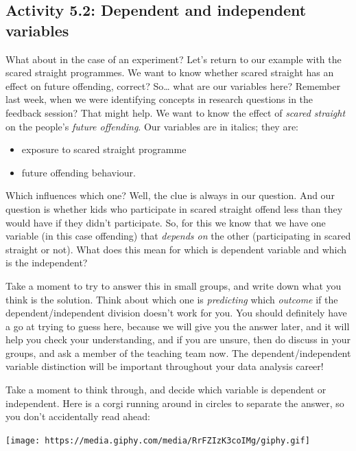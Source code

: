 \documentclass[
]{book}
\providecommand{\tightlist}{%
  \setlength{\itemsep}{0pt}\setlength{\parskip}{0pt}}
\begin{document}
\hypertarget{activity-5.2-dependent-and-independent-variables}{%
\subsection{Activity 5.2: Dependent and independent variables}\label{activity-5.2-dependent-and-independent-variables}}

What about in the case of an experiment? Let's return to our example with the scared straight programmes. We want to know whether scared straight has an effect on future offending, correct? So\ldots{} what are our variables here? Remember last week, when we were identifying concepts in research questions in the feedback session? That might help. We want to know the effect of \emph{scared straight} on the people's \emph{future offending}. Our variables are in italics; they are:

\begin{itemize}
\tightlist
\item
  exposure to scared straight programme
\item
  future offending behaviour.
\end{itemize}

Which influences which one? Well, the clue is always in our question. And our question is whether kids who participate in scared straight offend less than they would have if they didn't participate. So, for this we know that we have one variable (in this case offending) that \emph{depends on} the other (participating in scared straight or not). What does this mean for which is dependent variable and which is the independent?

Take a moment to try to answer this in small groups, and write down what you think is the solution. Think about which one is \emph{predicting} which \emph{outcome} if the dependent/independent division doesn't work for you. You should definitely have a go at trying to guess here, because we will give you the answer later, and it will help you check your understanding, and if you are unsure, then do discuss in your groups, and ask a member of the teaching team now. The dependent/independent variable distinction will be important throughout your data analysis career!

Take a moment to think through, and decide which variable is dependent or independent. Here is a corgi running around in circles to separate the answer, so you don't accidentally read ahead:

\texttt{[image: https://media.giphy.com/media/RrFZIzK3coIMg/giphy.gif]}
\end{document}
